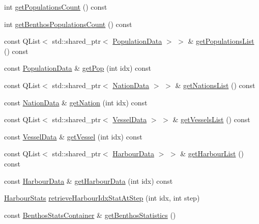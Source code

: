 \begin{DoxyCompactItemize}
int \mbox{\hyperlink{class_displace_model_a860cd84569af7e6825350c6373183699}{get\+Populations\+Count}} () const
\item 
int \mbox{\hyperlink{class_displace_model_a5a08d8dd8c8f2e64e67ff398e89d967c}{get\+Benthos\+Populations\+Count}} () const
\item 
const Q\+List$<$ std\+::shared\+\_\+ptr$<$ \mbox{\hyperlink{class_population_data}{Population\+Data}} $>$ $>$ \& \mbox{\hyperlink{class_displace_model_aea43bf1e18f08a8f2431ce18058c5e23}{get\+Populations\+List}} () const
\item 
const \mbox{\hyperlink{class_population_data}{Population\+Data}} \& \mbox{\hyperlink{class_displace_model_ac825c5ee7f50854a4356c2c45d69f965}{get\+Pop}} (int idx) const
\item 
const Q\+List$<$ std\+::shared\+\_\+ptr$<$ \mbox{\hyperlink{class_nation_data}{Nation\+Data}} $>$ $>$ \& \mbox{\hyperlink{class_displace_model_a4ad574a85bf902e2af3b2bb99f9b0cd6}{get\+Nations\+List}} () const
\item 
const \mbox{\hyperlink{class_nation_data}{Nation\+Data}} \& \mbox{\hyperlink{class_displace_model_a012e026bf7d17c416b678154a60ab451}{get\+Nation}} (int idx) const
\item 
const Q\+List$<$ std\+::shared\+\_\+ptr$<$ \mbox{\hyperlink{class_vessel_data}{Vessel\+Data}} $>$ $>$ \& \mbox{\hyperlink{class_displace_model_ae8f00781549547183a07b9d6d48f3da2}{get\+Vessels\+List}} () const
\item 
const \mbox{\hyperlink{class_vessel_data}{Vessel\+Data}} \& \mbox{\hyperlink{class_displace_model_a5ee657bbb24217f9a5a14f1320b0f454}{get\+Vessel}} (int idx) const
\item 
const Q\+List$<$ std\+::shared\+\_\+ptr$<$ \mbox{\hyperlink{class_harbour_data}{Harbour\+Data}} $>$ $>$ \& \mbox{\hyperlink{class_displace_model_a92ebef7f15ad0a7e6110ad67b24a1aff}{get\+Harbour\+List}} () const
\item 
const \mbox{\hyperlink{class_harbour_data}{Harbour\+Data}} \& \mbox{\hyperlink{class_displace_model_a0bdadd4654aea55d6e0481f43bc035fb}{get\+Harbour\+Data}} (int idx) const
\item 
\mbox{\hyperlink{class_harbour_stats}{Harbour\+Stats}} \mbox{\hyperlink{class_displace_model_afc1482f47afe0fd6e7a02219b86789db}{retrieve\+Harbour\+Idx\+Stat\+At\+Step}} (int idx, int step)
\item 
const \mbox{\hyperlink{class_displace_model_a58dc0cf9a12cf5a26c28dfdddd3f36ba}{Benthos\+Stats\+Container}} \& \mbox{\hyperlink{class_displace_model_aa9e8575daf8a3e730932257ea06be271}{get\+Benthos\+Statistics}} ()

\end{DoxyCompactItemize}
